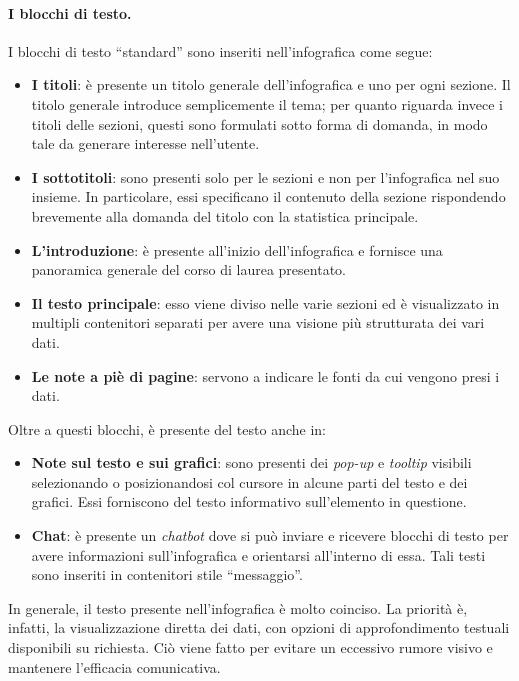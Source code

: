 \paragraph{I blocchi di testo.} I blocchi di testo ``standard'' sono inseriti nell'infografica come segue:
\begin{itemize}
    \item \textbf{I titoli}: è presente un titolo generale dell'infografica e uno per ogni sezione. Il titolo generale introduce semplicemente il tema; per quanto riguarda invece
    i titoli delle sezioni, questi sono formulati sotto forma di domanda, in modo tale da generare interesse nell'utente.
    \item \textbf{I sottotitoli}: sono presenti solo per le sezioni e non per l'infografica nel suo insieme. In particolare, essi specificano il contenuto della sezione rispondendo
    brevemente alla domanda del titolo con la statistica principale.
    \item \textbf{L'introduzione}: è presente all'inizio dell'infografica e fornisce una panoramica generale del corso di laurea presentato.
    \item \textbf{Il testo principale}: esso viene diviso nelle varie sezioni ed è visualizzato in multipli contenitori separati per avere una visione più strutturata dei vari dati.
    \item \textbf{Le note a piè di pagine}: servono a indicare le fonti da cui vengono presi i dati. 
\end{itemize}
Oltre a questi blocchi, è presente del testo anche in:
\begin{itemize}
    \item \textbf{Note sul testo e sui grafici}: sono presenti dei \emph{pop-up} e \emph{tooltip} visibili selezionando o posizionandosi col cursore in alcune parti del testo e dei grafici. Essi forniscono 
    del testo informativo sull'elemento in questione.
    \item \textbf{Chat}: è presente un \emph{chatbot} dove si può inviare e ricevere blocchi di testo per avere informazioni sull'infografica e orientarsi all'interno di essa. Tali testi sono 
    inseriti in contenitori stile ``messaggio''.
\end{itemize}
In generale, il testo presente nell'infografica è molto coinciso.
La priorità è, infatti, la visualizzazione diretta dei dati, con opzioni di approfondimento testuali disponibili su richiesta. 
Ciò viene fatto per evitare un eccessivo rumore visivo e mantenere l'efficacia comunicativa.

